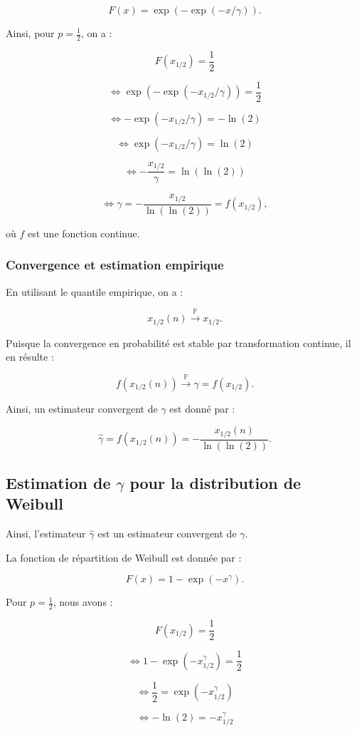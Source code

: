 \documentclass{article}
\begin{document}
\[
F(x) = \exp(-\exp(-x/\gamma)).
\]

Ainsi, pour \(p = \frac{1}{2}\), on a :

\[
F(x_{1/2}) = \frac{1}{2}
\]

\[
\iff \exp(-\exp(-x_{1/2}/\gamma)) = \frac{1}{2}
\]

\[
\iff -\exp(-x_{1/2}/\gamma) = -\ln(2)
\]

\[
\iff \exp(-x_{1/2}/\gamma) = \ln(2)
\]

\[
\iff -\frac{x_{1/2}}{\gamma} = \ln(\ln(2))
\]

\[
\iff \gamma = -\frac{x_{1/2}}{\ln(\ln(2))} = f(x_{1/2}),
\]

où \(f\) est une fonction continue.

\subsubsection{Convergence et estimation empirique}

En utilisant le quantile empirique, on a :

\[
x_{1/2}(n) \xrightarrow{\mathbb{P}} x_{1/2}.
\]

Puisque la convergence en probabilité est stable par transformation continue, il en résulte :

\[
f(x_{1/2}(n)) \xrightarrow{\mathbb{P}} \gamma = f(x_{1/2}).
\]

Ainsi, un estimateur convergent de \(\gamma\) est donné par :

\[
\hat{\gamma} = f(x_{1/2}(n)) = -\frac{x_{1/2}(n)}{\ln(\ln(2))}.
\]

\subsection{Estimation de \(\gamma\) pour la distribution de Weibull}

Ainsi, l'estimateur \(\hat{\gamma}\) est un estimateur convergent de \(\gamma\).

La fonction de répartition de Weibull est donnée par :

\[
F(x) = 1 - \exp(-x^{\gamma}).
\]

Pour \(p = \frac{1}{2}\), nous avons :

\[
F(x_{1/2}) = \frac{1}{2}
\]

\[
\iff 1 - \exp(-x_{1/2}^{\gamma}) = \frac{1}{2}
\]

\[
\iff \frac{1}{2} = \exp(-x_{1/2}^{\gamma})
\]

\[
\iff -\ln(2) = -x_{1/2}^{\gamma}
\]
\end{document}
